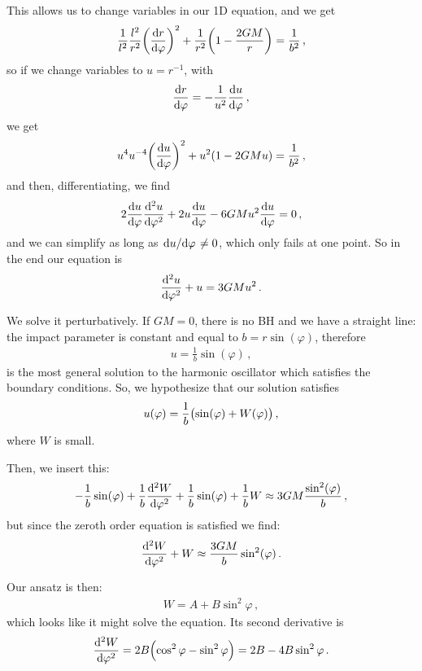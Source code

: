 \documentclass[main.tex]{subfiles}
\begin{document}
This allows us to change variables in our 1D equation, and we get 
%
\begin{align}
\frac{1}{l^2} \frac{l^2}{r^2} \qty(\dv{r}{\varphi })^2 + \frac{1}{r^2}\qty(1 - \frac{2GM}{r}) = \frac{1}{b^2}
\,,
\end{align}
%
so if we change variables to \(u = r^{-1}\), with 
%
\begin{align}
  \dv{r}{\varphi } = -\frac{1}{u^2} \dv{u }{\varphi }
\,,
\end{align}
%
we  get 
%
\begin{align}
  u^{4} u^{-4} \qty(\dv{u}{\varphi } )^2+ u^2 \qty(1-2GMu) = \frac{1}{b^2}
\,,
\end{align}
%
and then, differentiating, we find 
%
\begin{align}
  2 \dv{u}{\varphi } \dv[2]{u}{\varphi } + 2 u \dv{u}{\varphi } - 6GM u^2 \dv{u}{\varphi }= 0
\,,
\end{align}
%
and we can simplify as long as \(\dv*{u}{\varphi } \neq 0\), which only fails at one point. So in the end our equation is 
%
\begin{align}
  \dv[2]{u}{\varphi } + u = 3GMu^2
\,.
\end{align}
%

We solve it perturbatively. 
If \(GM=0\), there is no BH and we have a straight line: the impact parameter is constant and equal to  \(b = r \sin(\varphi )\), therefore 
%
\begin{align}
  u = \frac{1}{b} \sin(\varphi )
\,,
\end{align}
%
is the most general solution to the harmonic oscillator which satisfies the boundary conditions. 
So, we hypothesize that our solution satisfies 
%
\begin{align}
  u (\varphi ) = \frac{1}{b} \qty(\sin(\varphi ) + W(\varphi ))
\,,
\end{align}
%
where \(W\) is small. 

Then, we insert this: 
%
\begin{align}
  -\frac{1}{b} \sin(\varphi ) + \frac{1}{b} \dv[2]{W}{\varphi } +
  \frac{1}{b} \sin(\varphi )
  + \frac{1}{b} W \approx 3GM \frac{\sin^2(\varphi )}{b}
\,,
\end{align}
%
but since the zeroth order equation is satisfied we find: 
%
\begin{align}
  \dv[2]{W}{\varphi } + W \approx \frac{3GM}{b} \sin^2(\varphi )
\,. 
\end{align}

Our ansatz is then: 
%
\begin{align}
  W = A + B \sin^2 \varphi 
\,,
\end{align}
%
which looks like it might solve the equation. Its second derivative is 
%
\begin{align}
  \dv[2]{W}{\varphi } = 2B \qty(\cos^2 \varphi  - \sin^2 \varphi ) = 2B - 4B \sin^2\varphi 
\,.
\end{align}
\end{document}
